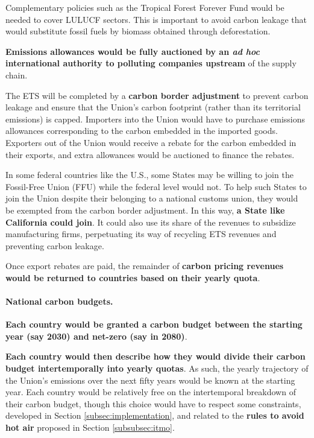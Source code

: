 \documentclass[12pt,english]{article}
\begin{document}
Complementary policies such as the Tropical Forest Forever Fund would be needed to cover LULUCF sectors. This is important to avoid carbon leakage that would substitute fossil fuels by biomass obtained through deforestation.

\textbf{Emissions allowances would be fully auctioned by an \textit{ad hoc} international authority to polluting companies upstream} of the supply chain. 

The ETS will be completed by a \textbf{carbon border adjustment} to prevent carbon leakage and ensure that the Union's carbon footprint (rather than its territorial emissions) is capped. Importers into the Union would have to purchase emissions allowances corresponding to the carbon embedded in the imported goods. Exporters out of the Union would receive a rebate for the carbon embedded in their exports, and extra allowances would be auctioned to finance the rebates. 

In some federal countries like the U.S., some States may be willing to join the Fossil-Free Union (FFU) while the federal level would not. To help such States to join the Union despite their belonging to a national customs union, they would be exempted from the carbon border adjustment. In this way, \textbf{a State like California could join}. It could also use its share of the revenues to subsidize manufacturing firms, perpetuating its way of recycling ETS revenues and preventing carbon leakage.

Once export rebates are paid, the remainder of \textbf{carbon pricing revenues would be returned to countries based on their yearly quota}.

\paragraph{National carbon budgets.}
\textbf{Each country would be granted a carbon budget between the starting year (say 2030) and net-zero (say in 2080)}. 

\textbf{Each country would then describe how they would divide their carbon budget intertemporally into yearly quotas}. As such, the yearly trajectory of the Union's emissions over the next fifty years would be known at the starting year. Each country would be relatively free on the intertemporal breakdown of their carbon budget, though this choice would have to respect some constraints, developed in Section \ref{subsec:implementation}, and related to the \textbf{rules to avoid hot air} proposed in Section \ref{subsubsec:itmo}.
\end{document}
